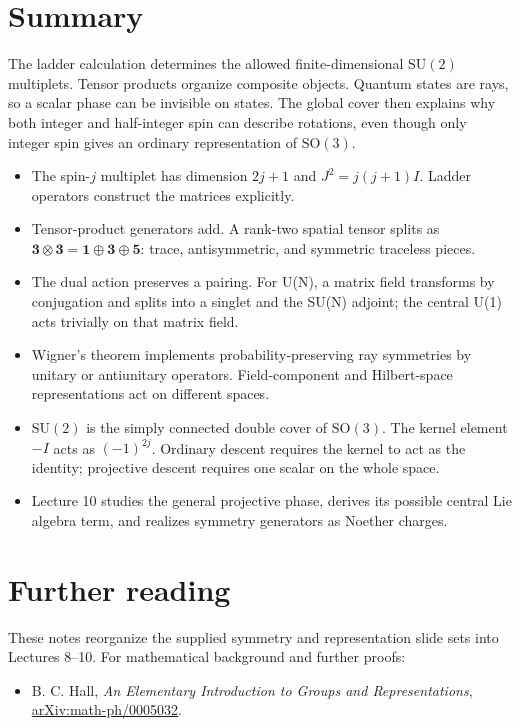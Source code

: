 \documentclass[11pt]{article}
\newcommand{\SO}{\mathrm{SO}}
\newcommand{\SU}{\mathrm{SU}}
\begin{document}
\section*{Summary}
\begin{keyidea}
The ladder calculation determines the allowed finite-dimensional
\(\SU(2)\) multiplets. Tensor products organize composite objects.
Quantum states are rays, so a scalar phase can be invisible on states.
The global cover then explains why both integer and half-integer spin
can describe rotations, even though only integer spin gives an ordinary
representation of \(\SO(3)\).
\end{keyidea}
\begin{itemize}
\item The spin-\(j\) multiplet has dimension \(2j+1\) and
\(J^2=j(j+1)I\). Ladder operators construct the matrices explicitly.
\item Tensor-product generators add. A rank-two spatial tensor splits
as \(\bm3\otimes\bm3=\bm1\oplus\bm3\oplus\bm5\): trace,
antisymmetric, and symmetric traceless pieces.
\item The dual action preserves a pairing. For U(N), a matrix field
transforms by conjugation and splits into a singlet and the SU(N)
adjoint; the central U(1) acts trivially on that matrix field.
\item Wigner's theorem implements probability-preserving ray symmetries
by unitary or antiunitary operators. Field-component and Hilbert-space
representations act on different spaces.
\item \(\SU(2)\) is the simply connected double cover of \(\SO(3)\).
The kernel element \(-I\) acts as \((-1)^{2j}\). Ordinary descent
requires the kernel to act as the identity; projective descent requires
one scalar on the whole space.
\item Lecture 10 studies the general projective phase, derives its
possible central Lie algebra term, and realizes symmetry generators as
Noether charges.
\end{itemize}

\section*{Further reading}
These notes reorganize the supplied symmetry and representation slide
sets into Lectures 8--10. For mathematical background and further proofs:
\begin{itemize}
\item B. C. Hall, \emph{An Elementary Introduction to Groups and
Representations}, \href{https://arxiv.org/abs/math-ph/0005032}{arXiv:math-ph/0005032}.
\end{itemize}
\end{document}
